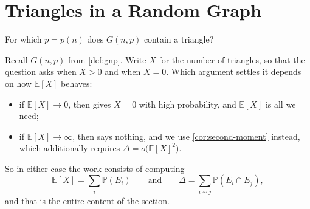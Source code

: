 \begin{center}
\end{center}


\section{Triangles in a Random Graph}\label{sec:triangles-gnp}

\begin{question}\label{q:triangle-threshold}
    For which \(p = p(n)\) does \(G(n,p)\) contain a triangle?
\end{question}

Recall \(G(n,p)\) from \autoref{def:gnp}. Write \(X\) for the number of triangles, so that the question asks when \(X > 0\) and when \(X = 0\). Which argument settles it depends on how \(\mathbb{E}[X]\) behaves:
\begin{itemize}
    \item if \(\mathbb{E}[X] \to 0\), then  gives \(X = 0\) with high probability, and \(\mathbb{E}[X]\) is all we need;
    \item if \(\mathbb{E}[X] \to \infty\), then  says nothing, and we use \autoref{cor:second-moment} instead, which additionally requires \(\Delta = o\bigl( \mathbb{E}[X]^{2} \bigr)\).
\end{itemize}
So in either case the work consists of computing
\[
    \mathbb{E}[X] = \sum_{i} \mathbb{P}(E_i)
    \qquad\text{and}\qquad
    \Delta = \sum_{i \sim j} \mathbb{P}(E_i \cap E_j),
\]
and that is the entire content of the section.

